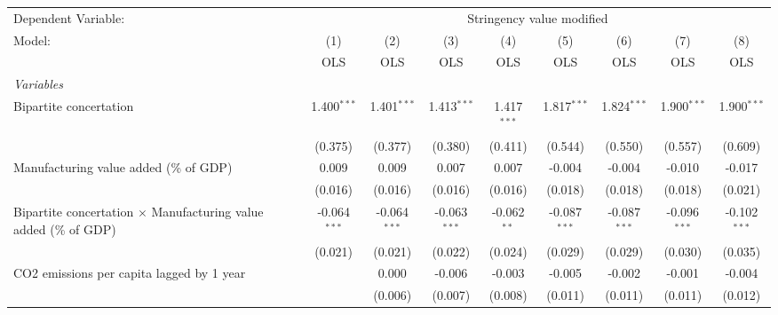
\begingroup
\centering
\begin{tabular}{lcccccccc}
   \toprule
   Dependent Variable: & \multicolumn{8}{c}{Stringency value modified}\\
   Model:                                                                  & (1)            & (2)            & (3)            & (4)           & (5)            & (6)            & (7)            & (8)\\  
                                                                           &  OLS           & OLS            & OLS            & OLS           & OLS            & OLS            & OLS            & OLS\\  
   \midrule
   \emph{Variables}\\
   Bipartite concertation                                                  & 1.400$^{***}$  & 1.401$^{***}$  & 1.413$^{***}$  & 1.417$^{***}$ & 1.817$^{***}$  & 1.824$^{***}$  & 1.900$^{***}$  & 1.900$^{***}$\\   
                                                                           & (0.375)        & (0.377)        & (0.380)        & (0.411)       & (0.544)        & (0.550)        & (0.557)        & (0.609)\\   
   Manufacturing value added (\% of GDP)                                   & 0.009          & 0.009          & 0.007          & 0.007         & -0.004         & -0.004         & -0.010         & -0.017\\   
                                                                           & (0.016)        & (0.016)        & (0.016)        & (0.016)       & (0.018)        & (0.018)        & (0.018)        & (0.021)\\   
   Bipartite concertation $\times$ Manufacturing value added (\% of GDP)   & -0.064$^{***}$ & -0.064$^{***}$ & -0.063$^{***}$ & -0.062$^{**}$ & -0.087$^{***}$ & -0.087$^{***}$ & -0.096$^{***}$ & -0.102$^{***}$\\   
                                                                           & (0.021)        & (0.021)        & (0.022)        & (0.024)       & (0.029)        & (0.029)        & (0.030)        & (0.035)\\   
   CO2 emissions per capita lagged by 1 year                               &                & 0.000          & -0.006         & -0.003        & -0.005         & -0.002         & -0.001         & -0.004\\   
                                                                           &                & (0.006)        & (0.007)        & (0.008)       & (0.011)        & (0.011)        & (0.011)        & (0.012)\\   

\end{tabular}
